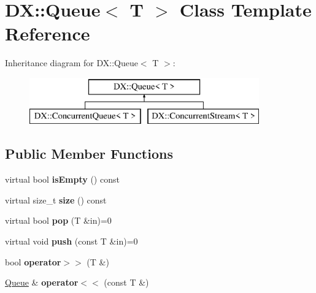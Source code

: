\hypertarget{class_d_x_1_1_queue}{\section{D\-X\-:\-:Queue$<$ T $>$ Class Template Reference}
\label{class_d_x_1_1_queue}
}
Inheritance diagram for D\-X\-:\-:Queue$<$ T $>$\-:\begin{figure}[H]
\begin{center}
\leavevmode
\includegraphics[height=2.000000cm]{class_d_x_1_1_queue}
\end{center}
\end{figure}
\subsection*{Public Member Functions}
\begin{DoxyCompactItemize}
\item 
\hypertarget{class_d_x_1_1_queue_af008aa136485037838cfe0f918792ab9}{virtual bool {\bfseries is\-Empty} () const }\label{class_d_x_1_1_queue_af008aa136485037838cfe0f918792ab9}

\item 
\hypertarget{class_d_x_1_1_queue_adf7128cfd7f99535b4c9a32e22af531e}{virtual size\-\_\-t {\bfseries size} () const }\label{class_d_x_1_1_queue_adf7128cfd7f99535b4c9a32e22af531e}

\item 
\hypertarget{class_d_x_1_1_queue_a37d06d4d1c44ef1393230f0ab995e585}{virtual bool {\bfseries pop} (T \&in)=0}\label{class_d_x_1_1_queue_a37d06d4d1c44ef1393230f0ab995e585}

\item 
\hypertarget{class_d_x_1_1_queue_a1b2b163d92437074055e89837a9414f1}{virtual void {\bfseries push} (const T \&in)=0}\label{class_d_x_1_1_queue_a1b2b163d92437074055e89837a9414f1}

\item 
\hypertarget{class_d_x_1_1_queue_a96ed0255ea3237a9cf66dd7f6aa85a27}{bool {\bfseries operator$>$$>$} (T \&)}\label{class_d_x_1_1_queue_a96ed0255ea3237a9cf66dd7f6aa85a27}

\item 
\hypertarget{class_d_x_1_1_queue_a89202fcd64704521f67b506266d06ec8}{\hyperlink{class_d_x_1_1_queue}{Queue} \& {\bfseries operator$<$$<$} (const T \&)}\label{class_d_x_1_1_queue_a89202fcd64704521f67b506266d06ec8}

\end{DoxyCompactItemize}
